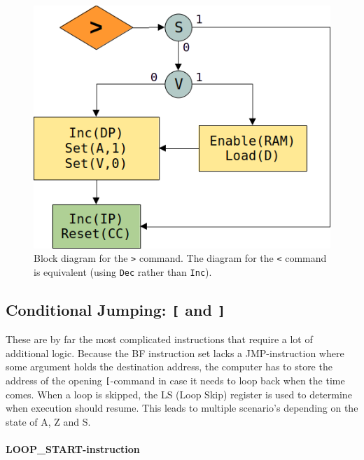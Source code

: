 \begin{figure}[H]
  \centering
  \includegraphics[scale=0.3]{img/rightalg}
  \caption{Block diagram for the \texttt{>} command. The diagram for the \texttt{<} command is equivalent (using \texttt{Dec} rather than \texttt{Inc}).}
  \label{fig:rightalg}
\end{figure}

\subsection{Conditional Jumping: \texttt{[} and \texttt{]}}
These are by far the most complicated instructions that require a lot of additional logic. Because the BF instruction set lacks a JMP-instruction where some argument holds the destination address, the computer has to store the address of the opening \texttt{[}-command in case it needs to loop back when the time comes. When a loop is skipped, the LS (Loop Skip) register is used to determine when execution should resume. This leads to multiple scenario's depending on the state of A, Z and S.
  
  \paragraph{LOOP\_START-instruction} 
  
